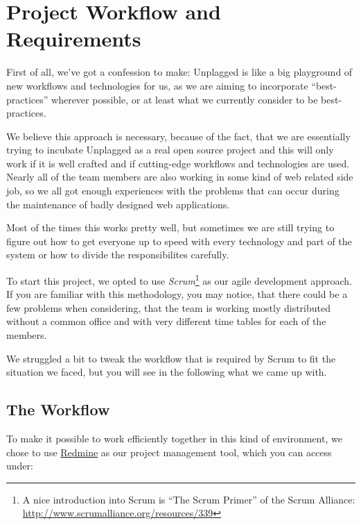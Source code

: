 \chapter{Project Workflow and  Requirements}
\label{chap:systemRequirements}

First of all, we've got a confession to make: Unplagged is like a big playground of new 
workflows and technologies for us, as we are aiming to incorporate 
\enquote{best-practices} wherever possible, or at least what we currently consider to be best-practices. 

We believe this approach is necessary, because of the 
fact, that we are essentially trying to incubate Unplagged as a real open source project and this will 
only work if
it is well crafted and if cutting-edge workflows and technologies are used. Nearly all of the team members
are also working in some kind of web related side job, so we all got enough experiences with the problems that can 
occur during the maintenance of badly designed web applications.

Most of the times this works pretty well, but sometimes we are still trying to figure out how to 
get everyone up to speed with every technology and part of the system or how to divide the responsibilites carefully.

To start this project, we opted to use \textit{Scrum}\footnote{A nice introduction into Scrum is \enquote{The Scrum Primer} 
of the Scrum Alliance: \url{http://www.scrumalliance.org/resources/339}} 
as our agile development approach. If you are familiar with this
methodology, you may notice, that there could be a few problems when considering, that the team is working mostly 
distributed
without a common office and with very different time tables for each of the members.

We struggled a bit to tweak the workflow that is required by Scrum to fit the situation we faced, but you will see in the
following what we came up with.

\section{The Workflow}

To make it possible to work efficiently together in this kind of environment, we chose to use
\href{http://www.redmine.org/}{Redmine} as our project management tool, which you can access under:

